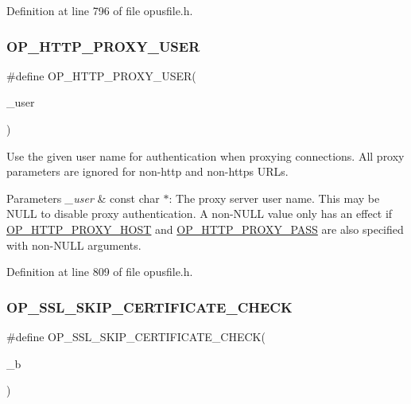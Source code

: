 Definition at line 796 of file opusfile.\+h.

\mbox{\label{group__url__options_gaf0ce8d761ff48697fa0c44a62a445842}} 
\subsubsection{\texorpdfstring{OP\_HTTP\_PROXY\_USER}{OP\_HTTP\_PROXY\_USER}}
{\footnotesize\ttfamily \#define O\+P\+\_\+\+H\+T\+T\+P\+\_\+\+P\+R\+O\+X\+Y\+\_\+\+U\+S\+ER(\begin{DoxyParamCaption}\item[{}]{\+\_\+user }\end{DoxyParamCaption})}

Use the given user name for authentication when proxying connections. All proxy parameters are ignored for non-\/http and non-\/https U\+R\+Ls. 
\begin{DoxyParams}{Parameters}
{\em \+\_\+user} & const char $\ast$\+: The proxy server user name. This may be {\ttfamily N\+U\+LL} to disable proxy authentication. A non-\/{\ttfamily N\+U\+LL} value only has an effect if \mbox{\hyperlink{group__url__options_gab3b517acdb74c0d0b51800af86a58876}{O\+P\+\_\+\+H\+T\+T\+P\+\_\+\+P\+R\+O\+X\+Y\+\_\+\+H\+O\+ST}} and \mbox{\hyperlink{group__url__options_gaad96c33557407e406cca89477b2e7892}{O\+P\+\_\+\+H\+T\+T\+P\+\_\+\+P\+R\+O\+X\+Y\+\_\+\+P\+A\+SS}} are also specified with non-\/{\ttfamily N\+U\+LL} arguments. \\
\hline
\end{DoxyParams}


Definition at line 809 of file opusfile.\+h.

\mbox{\label{group__url__options_ga71080150b55e223be2710a0307108b72}} 
\subsubsection{\texorpdfstring{OP\_SSL\_SKIP\_CERTIFICATE\_CHECK}{OP\_SSL\_SKIP\_CERTIFICATE\_CHECK}}
{\footnotesize\ttfamily \#define O\+P\+\_\+\+S\+S\+L\+\_\+\+S\+K\+I\+P\+\_\+\+C\+E\+R\+T\+I\+F\+I\+C\+A\+T\+E\+\_\+\+C\+H\+E\+CK(\begin{DoxyParamCaption}\item[{}]{\+\_\+b }\end{DoxyParamCaption})}

